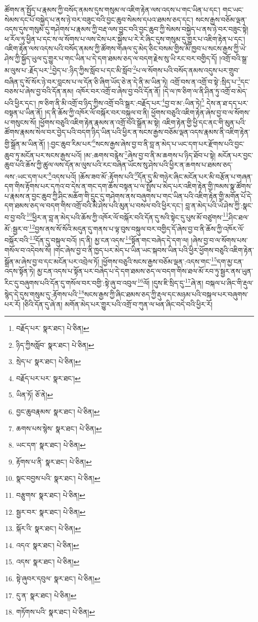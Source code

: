ཚོགས་ན་སྤྱོད་པ་རྣམས་ཀྱི་བསོད་ནམས་དུས་གསུམ་ལ་འཇིག་རྟེན་ལས་འདས་པ་གང་ཡིན་པ་དང་། གང་ཡང་སེམས་དང་པོ་བསྐྱེད་པ་ནས་ཉེ་བར་བཟུང་བའི་བྱང་ཆུབ་སེམས་དཔའ་ཐམས་ཅད་དང་། སངས་རྒྱས་བཅོམ་ལྡན་འདས་དུས་གསུམ་དུ་གཤེགས་པ་རྣམས་ཀྱི་བརྡ་ལས་བྱུང་བའི་བྱང་ཆུབ་ཀྱི་སེམས་བསྐྱེད་པ་ནས་ཉེ་བར་བཟུང་སྟེ། ཕ་རོལ་ཏུ་ཕྱིན་པ་དང་ས་ལ་སོགས་པ་ལས་ངེས་པར་སྐྱེས་པ་རེ་རེ་ཞིང་དུས་གསུམ་དུ་གྱུར་པ་འཇིག་རྟེན་པ་དང་། འཇིག་རྟེན་ལས་འདས་པའི་བསོད་ནམས་ཀྱི་ཚོགས་གཞལ་དུ་མེད་ཅིང་བསམ་གྱིས་མི་ཁྱབ་པ་སངས་རྒྱས་ཀྱི་ཡེ་ཤེས་ཀྱི་སྐྱོད་ཡུལ་དུ་གྱུར་པ་གང་ཡིན་པ་དེ་དག་ཐམས་ཅད་ལ་བདག་རྗེས་སུ་ཡི་རང་བར་བགྱིད་དོ། །འགྲོ་བའི་སྒྲ་མ་ལུས་པ་:རྗོད་པར་\footnote{བརྗོད་པར་  སྣར་ཐང་།  པེ་ཅིན། }བྱེད་པ་:ཉིད་ཀྱིས་སློབ་པ་དང་མི་སློབ་\footnote{ཉིད་ཀྱིསསློབ་  སྣར་ཐང་།  པེ་ཅིན། }པ་ལ་སོགས་པའི་བསོད་ནམས་འདུས་པར་གྲུབ་བཞིན་དུ་སོ་སོར་ཉེ་བར་བླངས་པ་ལ་དོན་ཅི་ཞིག་ཡོད་ཅེ་ན་དེ་ནི་མ་ཡིན་ཏེ། འགྲོ་བས་ན་འགྲོ་བ་སྟེ་:སྲིད་པ་\footnote{སྲེད་པ་  སྣར་ཐང་།  པེ་ཅིན། }དང་བཅས་པ་ཞེས་བྱ་བའི་དོན་ནམ། འཁོར་བར་འགྲོ་བ་ཞེས་བྱ་བའི་དོན་ནོ། །དེ་ལ་ཁ་ཅིག་ལ་ནི་ཤིན་ཏུ་འགྲོ་བ་མེད་པའི་ཕྱིར་དང་། ཁ་ཅིག་ནི་མི་འགྲོ་བ་ཉིད་ཀྱིས་འགྲོ་བའི་སྒྲར་:བརྗོད་པར་\footnote{བརྗོད་པར་པར་  སྣར་ཐང་། }བྱ་བ་མ་:ཡིན་ཏེ།\footnote{ཡིན་ཏོ།  ཅོ་ནེ། } དེས་ན་ཐ་དད་པར་བསྟན་པ་ཡིན་ནོ། །ད་ནི་ཆོས་ཀྱི་འཁོར་ལོ་བསྐོར་བར་བསྐུལ་བ་ནི། ཕྱོགས་བཅུའི་འཇིག་རྟེན་ཞེས་བྱ་བ་ལ་སོགས་པ་གསུངས་སོ། །ཕྱོགས་བཅུའི་འཇིག་རྟེན་རྣམས་ན་འགྲོ་བའི་སྒྲོན་མ་སྟེ། འཇིག་རྟེན་གྱི་ཕྱི་དང་ནང་གི་མུན་པའི་ཚོགས་རྣམས་སེལ་བར་བྱེད་པའི་བདག་ཉིད་ཡིན་པའི་ཕྱིར་ན་སངས་རྒྱས་བཅོམ་ལྡན་འདས་རྣམས་ནི་འཇིག་རྟེན་གྱི་སྒྲོན་མ་ཡིན་ནོ། །:བྱང་ཆུབ་རིམ་པར་\footnote{བྱང་ཆུབརྣམས་  སྣར་ཐང་།  པེ་ཅིན། }སངས་རྒྱས་ཞེས་བྱ་བ་ནི་བླ་ན་མེད་པ་ཡང་དག་པར་རྫོགས་པའི་བྱང་ཆུབ་ཏུ་མངོན་པར་སངས་རྒྱས་པའོ། །མ་:ཆགས་བརྙེས་\footnote{ཆགས་པས་སྙེས་  སྣར་ཐང་།  པེ་ཅིན། }ཞེས་བྱ་བ་ནི་མ་ཆགས་པ་ཉིད་ཐོབ་པ་སྟེ། མངོན་པར་བྱང་ཆུབ་པའི་ཆོས་ཀྱི་ཚུལ་ལས་དོན་མ་ལུས་པའི་རང་བཞིན་ཡོངས་སུ་ཤེས་པའི་ཕྱིར་ན་ཆགས་པ་ཐམས་ཅད་ལས་:ཡང་དག་པར་\footnote{ཡང་དག་  སྣར་ཐང་།  པེ་ཅིན། }འདས་པའོ། །ཆོས་ཟབ་མོ་:རྟོགས་པའི་\footnote{རྟོགས་པ་ནི་  སྣར་ཐང་།  པེ་ཅིན། }དོན་དུ་མི་གཉེར་ཞིང་མངོན་པར་མི་བརྩོན་པ་གཞན་དག་གིས་རྟོགས་པར་དཀའ་བ་དེས་ན་གང་དག་ཆོས་བསྟན་པ་ལ་སྤྲོས་པ་མེད་པར་འཇིག་རྟེན་གྱི་ཁམས་སྣ་ཚོགས་པ་རྣམས་ན་བྱང་ཆུབ་ཀྱི་ཤིང་མཆོག་གི་དྲུང་དུ་གཤེགས་ནས་བཞུགས་པ་གང་ཡིན་པའི་འཇིག་རྟེན་གྱི་མགོན་པོ་དེ་དག་ཐམས་ཅད་ལ་བདག་གིས་འགྲོ་བའི་མི་ཤེས་པའི་མུན་པ་བསལ་བའི་ཕྱིར་དང་། བླ་ན་མེད་པའི་ཡེ་ཤེས་ཀྱི་:སྣང་བ་བྱ་བའི་\footnote{སྣང་བབྱས་པའི་  སྣར་ཐང་།  པེ་ཅིན། }ཕྱིར་ན་བླ་ན་མེད་པའི་ཆོས་ཀྱི་འཁོར་ལོ་བསྐོར་བའི་དོན་དུ་སའི་སྟེང་དུ་པུས་མོ་བཙུགས་\footnote{བརྩུགས་  སྣར་ཐང་།  པེ་ཅིན། }ཤིང་ཐལ་མོ་:སྦྱར་བ་\footnote{སྦྱར་བར་  སྣར་ཐང་།  པེ་ཅིན། }བྱས་ནས་སོ་སོའི་མདུན་དུ་གནས་པ་ལྟ་བུས་བསྐུལ་བར་བགྱིད་དོ་ཞེས་བྱ་བ་ནི་ཆོས་ཀྱི་འཁོར་ལོ་བསྐོར་བའི་\footnote{སྐོར་འི་  སྣར་ཐང་།  པེ་ཅིན། }དོན་དུ་བསྐུལ་བའོ། །ད་ནི། མྱ་ངན་འདས་\footnote{འདའ་  སྣར་ཐང་།  པེ་ཅིན། }སྟོན་གང་བཞེད་དེ་དག་ལ། །ཞེས་བྱ་བ་ལ་སོགས་པས་གསོལ་བ་འདེབས་སོ། །གང་ཞེས་བྱ་བ་ནི་ཁྱད་པར་མེད་པ་ཡིན་ཡང་སྐབས་ཡིན་པའི་ཕྱིར་ཕྱོགས་བཅུའི་འཇིག་རྟེན་སྒྲོན་མ་ཞེས་བྱ་བ་དང་མངོན་པར་འབྲེལ་ཏོ། །ཕྱོགས་བཅུའི་སངས་རྒྱས་བཅོམ་ལྡན་:འདས་གང་\footnote{འདས་  སྣར་ཐང་།  པེ་ཅིན། }དག་མྱ་ངན་འདས་སྟོན་ཏེ། མྱ་ངན་འདས་པ་སྟོན་པར་བཞེད་པ་དེ་དག་ཐམས་ཅད་ལ་བདག་གིས་ཐལ་མོ་རབ་ཏུ་སྦྱར་ནས་ཡུན་རིང་དུ་བཞུགས་པའི་དོན་དུ་གསོལ་བར་བགྱི་:སྟེ་ཞུ་བ་འབུལ་\footnote{སྟེ་ཞུབར་དབུལ་  སྣར་ཐང་།  པེ་ཅིན། }ལོ། །དུས་ཇི་སྲིད་དུ་\footnote{དུ་ན་  སྣར་ཐང་།  པེ་ཅིན། }ཞེ་ན། བསྐལ་པ་ཞིང་གི་རྡུལ་སྙེད་དེ་དུས་གསུམ་དུ་:རྟོགས་པའི་\footnote{གཏོགས་པའི་  སྣར་ཐང་།  པེ་ཅིན། }སངས་རྒྱས་ཀྱི་ཞིང་ཐམས་ཅད་ཀྱི་རྡུལ་དང་མཉམ་པའི་བསྐལ་པར་བཞུགས་པར་རོ། །ཅིའི་དོན་དུ་ཞེ་ན། མགོན་མེད་པར་གྱུར་པའི་འགྲོ་བ་ཀུན་ལ་ཕན་ཞིང་བདེ་བའི་ཕྱིར་རོ། 